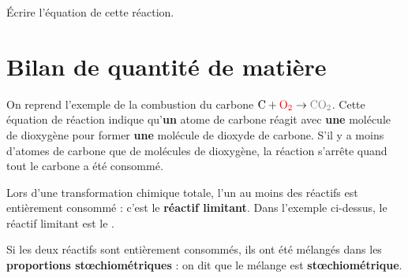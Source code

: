 \documentclass[12pt,a4paper,fleqn]{article}
\begin{document}
Écrire l'équation de cette réaction.
\begin{center}
\end{center}

\section{Bilan de quantité de matière}

On reprend l'exemple de la combustion du carbone $ \mathrm{C + {\color{red}O_2} \rightarrow {\color{gray}CO_2}}$. 
Cette équation de réaction indique qu'\textbf{un} atome de carbone réagit avec \textbf{une} molécule de dioxygène pour former \textbf{une} molécule de dioxyde de carbone.
S'il y a moins d'atomes de carbone que de molécules de dioxygène, la réaction s'arrête quand tout le carbone a été consommé.

\begin{center}
\newcommand{\carbon}[1]{\fill #1 rectangle ++(1,1);}
\newcommand{\dioxygen}[1]{\fill [color=red] #1 rectangle ++(1,1);}
\newcommand{\gaz}[1]{\fill [color=gray] #1 rectangle ++(1,1);}

\end{center}

Lors d'une transformation chimique totale, l'un au moins des réactifs est entièrement consommé : c'est le \textbf{réactif limitant}.
Dans l'exemple ci-dessus, le réactif limitant est le \textcolor{gray_c}{\underline{\phantom{carbone carbone}}}.

Si les deux réactifs sont entièrement consommés, ils ont été mélangés dans les \textbf{proportions stœchiométriques} : on dit que le mélange est \textbf{stœchiométrique}.
\end{document}
